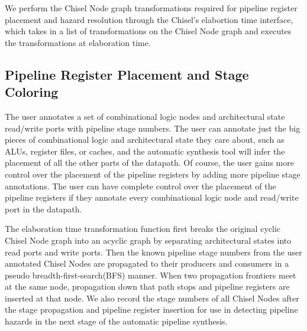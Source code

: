 We perform the Chisel Node graph transformations required for pipeline register placement and hazard resolution through the Chisel's elabortion time interface, which takes in a list of transformations on the Chisel Node graph and executes the transformations at elaboration time.
\subsection{Pipeline Register Placement and Stage Coloring}
The user annotates a set of combinational logic nodes
and architectural state read/write ports with pipeline stage
numbers. The user can annotate just the big pieces of combinational
logic and architectural state they care about, such as ALUs, register
files, or caches, and the automatic synthesis tool will infer the
placement of all the other parts of the datapath. Of course, the user
gains more control over the placement of the pipeline registers by
adding more pipeline stage annotations. The user can have complete
control over the placement of the pipeline registers if they annotate
every combinational logic node and read/write port in the datapath. 

The elaboration time transformation function
first breaks the original cyclic Chisel Node graph into an acyclic
graph by separating architectural states into read ports and write
ports. Then the known pipeline stage numbers from the user annotated
Chisel Nodes are propagated to their producers and consumers in a
pseudo breadth-first-search(BFS) manner. When two propagation
frontiers meet at the same node, propagation down that path stops and
pipeline registers are inserted at that node. We also record the stage
numbers of all Chisel Nodes after the stage propagation and pipeline
register insertion for use in detecting pipeline hazards in the next
stage of the automatic pipeline synthesis. 

